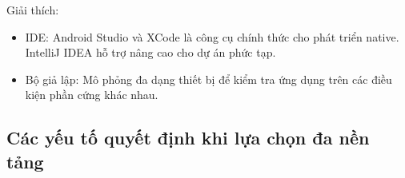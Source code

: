 \begin{flushleft}
    \begin{flushleft}
      \hspace*{0.8cm}Giải thích:
      \setlength{\leftmargini}{1.5cm}
      \begin{itemize}
        \item IDE: Android Studio và XCode là công cụ chính thức cho phát triển native. IntelliJ IDEA hỗ trợ nâng cao cho dự án phức tạp.
        \item Bộ giả lập: Mô phỏng đa dạng thiết bị để kiểm tra ứng dụng trên các điều kiện phần cứng khác nhau.
      \end{itemize}
    \end{flushleft}
\end{flushleft}

\subsection{Các yếu tố quyết định khi lựa chọn đa nền tảng}
\renewcommand{\labelitemi}{--}    

